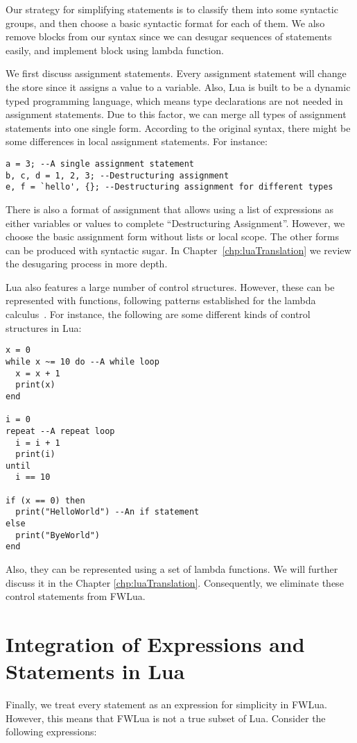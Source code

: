 Our strategy for simplifying statements is to classify them into some syntactic groups, and then choose a basic syntactic format for each of them.
We also remove blocks from our syntax since we can desugar sequences of statements easily, and implement block using lambda function.

We first discuss assignment statements. Every assignment statement will change the store since it assigns a value to a variable. Also, Lua is built to be a dynamic typed programming language, which means type declarations are not needed in assignment statements. Due to this factor, we can merge all types of assignment statements into one single form. According to the original syntax, there might be some differences in local assignment statements. For instance:

\newpage
\begin{verbatim}
a = 3; --A single assignment statement
b, c, d = 1, 2, 3; --Destructuring assignment
e, f = `hello', {}; --Destructuring assignment for different types
\end{verbatim}

There is also a format of assignment that allows using a list of expressions as either variables or values to complete ``Destructuring Assignment''. However, we choose the basic assignment form without lists or local scope. The other forms can be produced with syntactic sugar.
In Chapter~\ref{chp:luaTranslation} we review the desugaring process in more depth.

Lua also features a large number of control structures. However, these can be represented with functions, following patterns established for the lambda calculus~\cite{TAPL}. For instance, the following are some different kinds of control structures in Lua:

\begin{verbatim}
x = 0
while x ~= 10 do --A while loop
  x = x + 1
  print(x)
end

i = 0
repeat --A repeat loop
  i = i + 1
  print(i)
until
  i == 10

if (x == 0) then 
  print("HelloWorld") --An if statement
else 
  print("ByeWorld")
end
\end{verbatim}

Also, they can be represented using a set of lambda functions. We will further discuss it in the Chapter \ref{chp:luaTranslation}. Consequently, we eliminate these control statements from FWLua.

\section{Integration of Expressions and Statements in Lua}
Finally, we treat every statement as an expression for simplicity in FWLua. However, this means that FWLua is not a true subset of Lua. Consider the following expressions:

